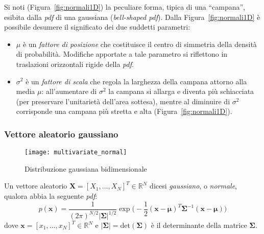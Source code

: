 \noindent Si noti (Figura~\ref{fig:normali1D}) la peculiare forma, tipica di una “campana”, esibita dalla \emph{pdf} di una gaussiana (\emph{bell-shaped pdf}). 
Dalla Figura~\ref{fig:normali1D} è possibile desumere il significato dei due suddetti parametri:
\begin{itemize}
    \item $\mu$ è un \emph{fattore di posizione} che costituisce il centro di simmetria della densità di probabilità.
    Modifiche apportate a tale parametro si riflettono in traslazioni orizzontali rigide della \emph{pdf}. 
    \item $\sigma^2$ è un \emph{fattore di scala} che regola la larghezza della campana attorno alla media $\mu$: all'aumentare di $\sigma^2$ 
    la campana si allarga e diventa più schiacciata (per preservare l'unitarietà dell'area sottesa), mentre 
    al diminuire di $\sigma^2$ corrisponde una campana più stretta e alta (Figura~\ref{fig:normali1D}).
\end{itemize} 




\subsubsection{Vettore aleatorio gaussiano}

\begin{figure}
    \centering
    \texttt{[image: multivariate\_normal]}
    \caption{Distribuzione gaussiana bidimensionale}
\end{figure}


\begin{Mybox}
    \begin{definizione}
        Un vettore aleatorio $\mathbf{X}=[X_1,\dots,X_N]^T \in \mathbb{R}^N$ dicesi \emph{gaussiano}, o \emph{normale}, qualora abbia la seguente \emph{pdf}:
        \begin{equation}
               p(\mathbf{x})=\frac{1}{(2\pi)^{N/2}\lvert  \mathbf{\Sigma} \rvert^{1/2} }\exp \biggl(-\frac{1}{2}(\mathbf{x}-\bm{\mu})^{T} \mathbf{\Sigma}^{-1}(\mathbf{x}-\bm{\mu})\biggr)
        \end{equation}
        dove $\mathbf{x}=[x_1,\dots,x_N]^T \in \mathbb{R}^N$ e $\lvert \mathbf{\Sigma} \rvert = \text{det}(\mathbf{\Sigma})$ è il determinante della matrice $\mathbf{\Sigma}$.    
    \end{definizione}
\end{Mybox}

